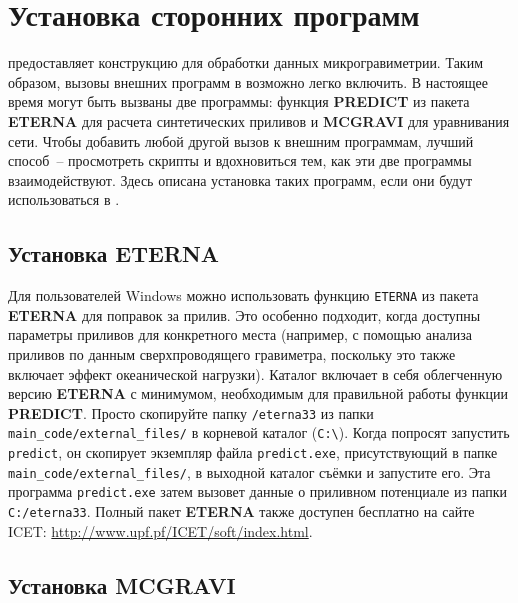 \chapter[Установка сторонних программ]{Установка сторонних программ}
\label{chap:installing_external_programs}

\pg{} предоставляет конструкцию для обработки данных микрогравиметрии. Таким
образом, вызовы внешних программ в \pg{} возможно легко включить. В настоящее
время могут быть вызваны две программы: функция \textbf{\textsf{PREDICT}} из
пакета \textbf{\textsf{ETERNA}} \cite{wenzel_1996} для расчета синтетических
приливов и \textbf{\textsf{MCGRAVI}} \cite{beilin_2006} для уравнивания сети.
Чтобы добавить любой другой вызов к внешним программам, лучший способ~--
просмотреть скрипты \pg{} и вдохновиться тем, как эти две программы
взаимодействуют. Здесь описана установка таких программ, если они будут
использоваться в \pg{}.

\section[Установка ETERNA]{Установка ETERNA}
\label{sec:eterna_installation}

Для пользователей Windows можно использовать функцию \verb|ETERNA| из пакета
\textbf{\textsf{ETERNA}} \cite{wenzel_1996} для поправок за прилив. Это особенно
подходит, когда доступны параметры приливов для конкретного места (например, с
помощью анализа приливов по данным сверхпроводящего гравиметра, поскольку это
также включает эффект океанической нагрузки). Каталог \pg{} включает в себя
облегченную версию \textbf{\textsf{ETERNA}} с минимумом, необходимым для
правильной работы функции \textbf{\textsf{PREDICT}}. Просто скопируйте папку
\verb|/eterna33| из папки \verb|main_code/external_files/| в корневой каталог
(\verb|C:\|). Когда \pg{} попросят запустить \verb|predict|, он скопирует
экземпляр файла \verb|predict.exe|, присутствующий в папке
\verb|main_code/external_files/|, в выходной каталог съёмки и запустите его. Эта
программа \verb|predict.exe| затем вызовет данные о приливном потенциале из
папки \verb|C:/eterna33|. Полный пакет \textbf{\textsf{ETERNA}} также доступен
бесплатно на сайте ICET: \url{http://www.upf.pf/ICET/soft/index.html}.

\section[Установка MCGRAVI]{Установка MCGRAVI}
\label{sec:mcgravi_installation}


